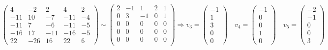 \documentclass{article}
\begin{document}
$$\begin{pmatrix}
4 & -2 & 2 & 4 & 2 \\
-11 & 10 & -7 & -11 & -4 \\
-11 & 7 & -6 & -11 & -5\\
-16 & 17 & -11 & -16 & -5 \\
22 & -26 & 16 & 22 & 6
\end{pmatrix} \sim \begin{pmatrix}
2 & -1 & 1 & 2 & 1 \\
0 & 3 & -1 & 0 & 1 \\
0 & 0 & 0 & 0 & 0 \\
0 & 0 & 0 & 0 & 0 \\
0 & 0 & 0 & 0 & 0 \\
\end{pmatrix} \Rightarrow  v_3 = \begin{pmatrix}
-1 \\ 1 \\ 3 \\ 0 \\ 0
\end{pmatrix} \quad v_4 = \begin{pmatrix}
-1 \\ 0 \\ 0 \\ 1 \\ 0
\end{pmatrix} \quad v_5 = \begin{pmatrix}
-2 \\ -1 \\ 0 \\ 0 \\ 3
\end{pmatrix}$$
\end{document}
